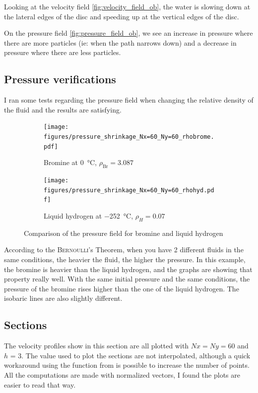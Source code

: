 Looking at the velocity field \autoref{fig:velocity_field_ob}, the water is
slowing down at the lateral edges of the disc and speeding up at the vertical
edges of the disc.

On the pressure field \autoref{fig:pressure_field_ob}, we see an increase in
pressure where there are more particles (ie: when the path narrows down) and
a decrease in pressure where there are less particles.

\newpage
\subsection{Pressure verifications}
I ran some tests regarding the pressure field when changing the relative
density of the fluid and the results are satisfying.

\begin{figure}[htbp]
      \centering
      \begin{subfigure}{.45\textwidth}
            \texttt{[image: figures/pressure\_shrinkage\_Nx=60\_Ny=60\_rhobrome.pdf]}
            \caption{Bromine at \SI{0}{\celsius}, $\rho_{\text{Br}} = 3.087$}\label{fig:pressure_brome}
      \end{subfigure}
      \begin{subfigure}{.45\textwidth}
            \texttt{[image: figures/pressure\_shrinkage\_Nx=60\_Ny=60\_rhohyd.pdf]}
            \caption{Liquid hydrogen at \SI{-252}{\celsius}, $\rho_{H} = 0.07$}\label{fig:pressure_hydrogen}
      \end{subfigure}
      \caption{Comparison of the pressure field for bromine and liquid hydrogen}
      \label{fig:pressure_com}
\end{figure}

According to the \textsc{Bernoulli}'s Theorem, when you have
2 different fluids in the same conditions, the heavier the fluid, the higher
the pressure. In this example, the bromine is heavier than the liquid hydrogen,
and the graphs are showing that property really well. With the same initial
pressure and the same conditions, the pressure of the bromine rises higher than
the one of the liquid hydrogen. The isobaric lines are also slightly
different.

\newpage
\subsection{Sections}\label{sec:section}
The velocity profiles show in this section are all plotted with $Nx = Ny = 60$
and $h$ = 3. The value used to plot the sections are not interpolated, although
a quick workaround using the \textcolor{func}{} function from
 is possible to increase the number of points. All the computations
are made with normalized vectors, I found the plots are easier to read that
way.

